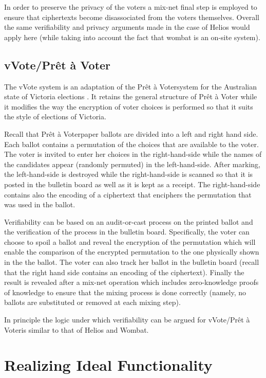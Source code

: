 In order to preserve the privacy of the voters a mix-net final step is
employed to ensure that ciphertexts become disassociated from the
voters themselves. Overall the same verifiability and privacy
arguments made in the case of Helios would apply here (while taking
into account the fact that wombat is an on-site system).

\newcommand{\PaV}{Pr{\^{e}}t {\`{a}} Voter}

\subsection{vVote/\PaV}

The vVote system is an adaptation of the \PaV system for the
Australian state of Victoria elections \cite{vvote}. It retains the
general structure of \PaV \cite{pret-a-voter}
while it modifies the way the encryption of voter choices is performed
so that it suits the style of elections of Victoria.

Recall that \PaV paper ballots are divided into a left and
right hand side. Each ballot contains a permutation of the choices
that are available to the voter. The voter is invited to enter her
choices in the right-hand-side while the names of the candidates
appear (randomly permuted) in the left-hand-side. After marking, the
left-hand-side is destroyed while the right-hand-side is scanned so
that it is posted in the bulletin board as well as it is kept as a
receipt. The right-hand-side contains also the encoding of a
ciphertext that enciphers the permutation that was used in the ballot.

Verifiability can be based on an audit-or-cast process on the printed
ballot and the verification of the process in the bulletin
board. Specifically, the voter can choose to spoil a ballot and reveal
the encryption of the permutation which will enable the comparison of
the encrypted permutation to the one physically shown in the the
ballot. The voter can also track her ballot in the bulletin board
(recall that the right hand side contains an encoding of the
ciphertext). Finally the result is revealed after a mix-net operation
which includes zero-knowledge proofs of knowledge to ensure that the
mixing process is done correctly (namely, no ballots are substituted
or removed at each mixing step).

In principle the logic under which verifiability can be argued for
vVote/\PaV is similar to that of Helios and Wombat.

\section{Realizing Ideal Functionality}

